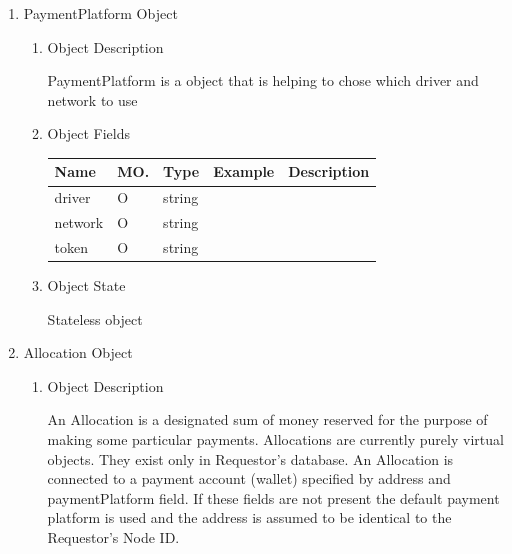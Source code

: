 \begin{enumerate}
\begin{enumerate}
\begin{table}[H]
\begin{center}
\begin{tabular}{|p{3cm}|p{11cm}|}
\end{tabular}
\end{center}
\end{table}

\end{enumerate}


\item PaymentPlatform Object

\begin{enumerate}

\item Object Description

PaymentPlatform is a object that is helping to chose which driver and network to use

\item Object Fields

\begin{table}[H]
\footnotesize

\begin{center}
\begin{tabular}{|p{3cm}|l|p{3cm}|p{3cm}|p{4cm}|} 
\hline
\rowcolor{lightgray}	Name	& MO.	& Type	& Example & 	Description \\
\hline

driver		& O & string				&							& 							\\
\hline
network		& O & string				&							& 							\\
\hline
token		& O & string				&							& 							\\
\hline

\end{tabular}
\end{center}
\end{table}

\item Object State

Stateless object

\end{enumerate}


\item Allocation Object

\begin{enumerate}

\item Object Description

An Allocation is a designated sum of money reserved for the purpose of making some particular payments. 
Allocations are currently purely virtual objects. 
They exist only in Requestor's database. 
An Allocation is connected to a payment account (wallet) specified by address and paymentPlatform field. 
If these fields are not present the default payment platform is used and the address is assumed to be 
identical to the Requestor's Node ID.


\end{enumerate}
\end{enumerate}
